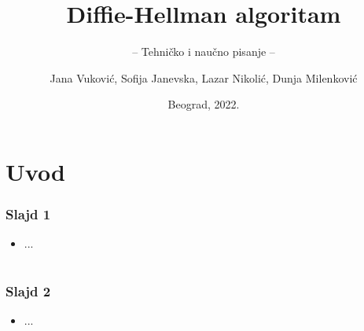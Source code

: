 \documentclass[14pt]{beamer}
\title{Diffie-Hellman algoritam}
\subtitle{-- Tehničko i naučno pisanje --}
\author{Jana Vuković, Sofija Janevska, Lazar Nikolić, Dunja Milenković}
\institute{Matematički fakultet\\Univerzitet u Beogradu}
\date{
	\footnotesize{Beograd, 2022.}	
}
\begin{document}
\begin{frame}
	\thispagestyle{empty}
	\titlepage
\end{frame}

\addtocounter{framenumber}{-1}

\section{Uvod}

\begin{frame}[fragile]\frametitle{Slajd 1}
	\begin{itemize}
		\item ...
	\end{itemize}
\end{frame}

\section*{}

\begin{frame}[fragile]\frametitle{Slajd 2}
	 \begin{itemize}
		\item ...
	\end{itemize}
\end{frame}
\end{document}
